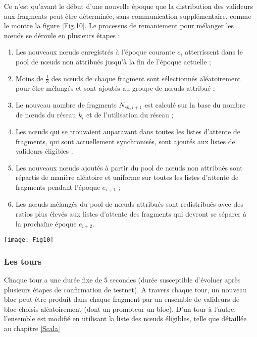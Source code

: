 \documentclass[journal]{IEEEtran}
\begin{document}
Ce n'est qu'avant le début d'une nouvelle époque que la distribution des valideurs aux fragments peut être déterminée, sans communication supplémentaire, comme le montre la figure \ref{Fig.10}.
Le processus de remaniement pour mélanger les nœuds se déroule en plusieurs étapes :
\begin{enumerate}
  \item Les nouveaux nœuds enregistrés à l'époque courante ${e}_{i}$ atterrissent dans le pool de nœuds non attribués jusqu'à la fin de l'époque actuelle ;
  \item Moins de $\frac{1}{3}$ des nœuds de chaque fragment sont sélectionnés aléatoirement  pour être mélangés et sont ajoutés au groupe de nœuds attribué ;
  \item Le nouveau nombre de fragments ${N}_{sh,i+1}$ est calculé sur la base du nombre de nœuds du réseau ${k}_{i}$ et de l'utilisation du réseau ;
  \item Les nœuds qui se trouvaient auparavant dans toutes les listes d'attente de fragments, qui sont actuellement synchronisés, sont ajoutés aux listes de valideurs éligibles ;
  \item Les nouveaux nœuds ajoutés à partir du pool de nœuds non attribués sont répartis de manière aléatoire et uniforme sur toutes les listes d'attente de fragments pendant l'époque ${e}_{i+1}$ ;
  \item Les nœuds mélangés du pool de nœuds attribués sont redistribués avec des ratios plus élevés aux listes d'attente des fragments qui devront se séparer à la prochaîne  époque ${e}_{i+2}$.
\end{enumerate}

\begin{figure*}[h]
         \centering
	\texttt{[image: Fig10]} %
	\caption{Remaniement des nœuds à la fin de chaque époque} %
	\label{Fig.10} %
\end{figure*}

\subsubsection{Les tours} 
Chaque tour a une durée fixe de 5 secondes (durée susceptible d'évoluer après plusieurs étapes de confirmation de testnet). A travers chaque tour, un nouveau bloc peut être produit dans chaque fragment par un ensemble de valideurs de bloc choisis aléatoirement (dont un promoteur un bloc). D'un tour à l'autre, l'ensemble est modifié en utilisant la liste des nœuds éligibles, telle que détaillée au chapitre \ref{Scala}
\end{document}
